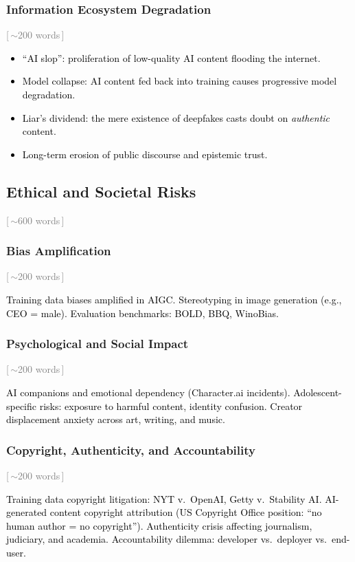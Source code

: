 \documentclass[preprint,12pt]{elsarticle}
\newcommand{\wordcount}[1]{\hfill\textcolor{gray}{\small[\,#1\,]}}
\newcommand{\outline}[1]{\textcolor{black}{#1}}
\begin{document}
\subsubsection{Information Ecosystem Degradation} \wordcount{$\sim$200 words}

\outline{%
\begin{itemize}[nosep,leftmargin=1.5em]
    \item ``AI slop'': proliferation of low-quality AI content flooding the internet.
    \item Model collapse: AI content fed back into training causes progressive model degradation.
    \item Liar's dividend: the mere existence of deepfakes casts doubt on \emph{authentic} content.
    \item Long-term erosion of public discourse and epistemic trust.
\end{itemize}
}


\subsection{Ethical and Societal Risks} \wordcount{$\sim$600 words}
\label{sec:threat-ethics}

\subsubsection{Bias Amplification} \wordcount{$\sim$200 words}

\outline{%
Training data biases amplified in AIGC. Stereotyping in image generation (e.g., CEO = male). Evaluation benchmarks: BOLD, BBQ, WinoBias.
}

\subsubsection{Psychological and Social Impact} \wordcount{$\sim$200 words}

\outline{%
AI companions and emotional dependency (Character.ai incidents). Adolescent-specific risks: exposure to harmful content, identity confusion. Creator displacement anxiety across art, writing, and music.
}

\subsubsection{Copyright, Authenticity, and Accountability} \wordcount{$\sim$200 words}

\outline{%
Training data copyright litigation: NYT v.\ OpenAI, Getty v.\ Stability AI. AI-generated content copyright attribution (US Copyright Office position: ``no human author = no copyright''). Authenticity crisis affecting journalism, judiciary, and academia. Accountability dilemma: developer vs.\ deployer vs.\ end-user.
}
\end{document}
